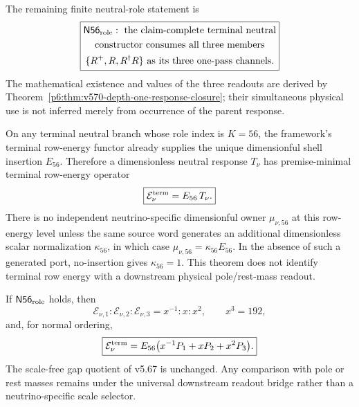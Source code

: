 \documentclass[12pt,a4paper]{article}
\begin{document}
\begin{definition}
\label{p6:def:v570-terminal-three-role-gate}
The remaining finite neutral-role statement is
\[
 \boxed{\begin{gathered}
 \mathsf{N56}_{\rm role}:\ \text{the claim-complete terminal neutral}\\
 \text{constructor consumes all three members}\\
 \{R^+,R,R^\dagger R\}\ \text{as its three one-pass channels}.
 \end{gathered}}
\]
The mathematical existence and values of the three readouts are derived by
Theorem~\ref{p6:thm:v570-depth-one-response-closure}; their simultaneous
physical use is not inferred merely from occurrence of the parent response.
\end{definition}

\begin{theorem}
\label{p6:thm:v570-e56-terminal-row-energy-scale}
On any terminal neutral branch whose role index is \(K=56\), the framework's
terminal row-energy functor already supplies the unique dimensionful shell
insertion \(E_{56}\).  Therefore a dimensionless neutral response
\(T_\nu\) has premise-minimal terminal row-energy operator
\[
 \boxed{\mathcal E_\nu^{\rm term}=E_{56}\,T_\nu.}
\]
There is no independent neutrino-specific dimensionful owner
\(\mu_{\nu,56}\) at this row-energy level unless the same source word
generates an additional dimensionless scalar normalization
\(\kappa_{56}\), in which case \(\mu_{\nu,56}=\kappa_{56}E_{56}\).  In the
absence of such a generated port, no-insertion gives \(\kappa_{56}=1\).
This theorem does not identify terminal row energy with a downstream physical
pole/rest-mass readout.
\end{theorem}

\begin{corollary}
\label{p6:cor:v570-e56-three-role-spectrum}
If \(\mathsf{N56}_{\rm role}\) holds, then
\[
 \boxed{\mathcal E_{\nu,1}:\mathcal E_{\nu,2}:\mathcal E_{\nu,3}
 =x^{-1}:x:x^2,\qquad x^3=192,}
\]
and, for normal ordering,
\[
 \boxed{\mathcal E_\nu^{\rm term}
 =E_{56}\bigl(x^{-1}P_1+xP_2+x^2P_3\bigr).}
\]
The scale-free gap quotient of v5.67 is unchanged.  Any comparison with pole
or rest masses remains under the universal downstream readout bridge rather
than a neutrino-specific scale selector.
\end{corollary}
\end{document}

